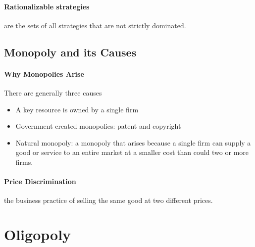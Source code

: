 \documentclass[a4paper,titlepage] {scrartcl}
\begin{document}
\paragraph{Rationalizable strategies} %
\label{par:rationalizable_strategies}
are the sets of all strategies that are not strictly dominated.


\subsection{Monopoly and its Causes} %
\label{sub:monopoly_and_its_causes}


\paragraph{Why Monopolies Arise} %
\label{par:why_monopolies_arise}
There are generally three causes
\begin{itemize}
	\item A key resource is owned by a single firm
	\item Government created monopolies: patent and copyright
	\item Natural monopoly: a monopoly that arises because a single firm can supply a good or service to an entire market at a smaller cost than could two or more firms.
\end{itemize}


\paragraph{Price Discrimination} %
\label{par:price_discrimination}
the business practice of selling the same good at two different prices.





\section{Oligopoly}
\end{document}
